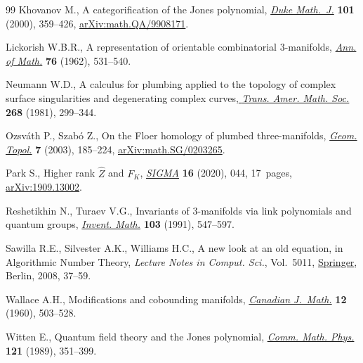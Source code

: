 \documentclass[pdftex]{sigma}
\numberwithin{equation}{section}
\begin{document}
\begin{thebibliography}{99}
Khovanov M., A categorification of the {J}ones polynomial, \href{https://doi.org/10.1215/S0012-7094-00-10131-7}{\textit{Duke
 Math.~J.}} \textbf{101} (2000), 359--426, \href{https://arxiv.org/abs/math.QA/9908171}{arXiv:math.QA/9908171}.

Lickorish W.B.R., A representation of orientable combinatorial {$3$}-manifolds,
 \href{https://doi.org/10.2307/1970373}{\textit{Ann. of Math.}} \textbf{76} (1962), 531--540.

Neumann W.D., A calculus for plumbing applied to the topology of complex
 surface singularities and degenerating complex curves,\href{https://doi.org/10.2307/1999331}{ \textit{Trans. Amer.
 Math. Soc.}} \textbf{268} (1981), 299--344.

Ozsv\'ath P., Szab\'o Z., On the {F}loer homology of plumbed three-manifolds,
 \href{https://doi.org/10.2140/gt.2003.7.185}{\textit{Geom. Topol.}} \textbf{7} (2003), 185--224, \href{https://arxiv.org/abs/math.SG/0203265}{arXiv:math.SG/0203265}.

Park S., Higher rank {$\hat{Z}$} and {$F_K$}, \href{https://doi.org/10.3842/SIGMA.2020.044}{\textit{SIGMA}} \textbf{16}
 (2020), 044, 17~pages, \href{https://arxiv.org/abs/1909.13002}{arXiv:1909.13002}.

Reshetikhin N., Turaev V.G., Invariants of {$3$}-manifolds via link polynomials
 and quantum groups, \href{https://doi.org/10.1007/BF01239527}{\textit{Invent. Math.}} \textbf{103} (1991), 547--597.

Sawilla R.E., Silvester A.K., Williams H.C., A new look at an old equation, in
 Algorithmic Number Theory, \textit{Lecture Notes in Comput. Sci.}, Vol.~5011,
 \href{https://doi.org/10.1007/978-3-540-79456-1_2}{Springer}, Berlin, 2008, 37--59.

Wallace A.H., Modifications and cobounding manifolds, \href{https://doi.org/10.4153/CJM-1960-045-7}{\textit{Canadian
 J.~Math.}} \textbf{12} (1960), 503--528.

Witten E., Quantum field theory and the {J}ones polynomial, \href{https://doi.org/10.1007/BF01217730}{\textit{Comm. Math.
 Phys.}} \textbf{121} (1989), 351--399.

\end{thebibliography}\LastPageEnding
\end{document}
